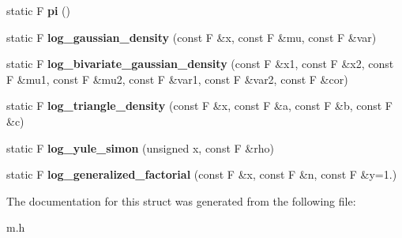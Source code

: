 \begin{DoxyCompactItemize}
\item 
\mbox{\label{structcpyp_1_1_m_a58adc8fa98b35a34becd1290afaf83da}} 
static F {\bfseries pi} ()
\item 
\mbox{\label{structcpyp_1_1_m_af8b5f1b8190598cdb8305c1768250c1c}} 
static F {\bfseries log\+\_\+gaussian\+\_\+density} (const F \&x, const F \&mu, const F \&var)
\item 
\mbox{\label{structcpyp_1_1_m_af01ae1f716cb8aa9252b7c759c31e3b0}} 
static F {\bfseries log\+\_\+bivariate\+\_\+gaussian\+\_\+density} (const F \&x1, const F \&x2, const F \&mu1, const F \&mu2, const F \&var1, const F \&var2, const F \&cor)
\item 
\mbox{\label{structcpyp_1_1_m_af4547b923bfe3cb986ed9d2c9f37ee7d}} 
static F {\bfseries log\+\_\+triangle\+\_\+density} (const F \&x, const F \&a, const F \&b, const F \&c)
\item 
\mbox{\label{structcpyp_1_1_m_abbf82af5c06a64b3783bb4edf8162352}} 
static F {\bfseries log\+\_\+yule\+\_\+simon} (unsigned x, const F \&rho)
\item 
\mbox{\label{structcpyp_1_1_m_a0b5a2a1211ee3b2abb97b373d4cdbf59}} 
static F {\bfseries log\+\_\+generalized\+\_\+factorial} (const F \&x, const F \&n, const F \&y=1.)
\end{DoxyCompactItemize}


The documentation for this struct was generated from the following file\+:\begin{DoxyCompactItemize}
\item 
m.\+h\end{DoxyCompactItemize}
